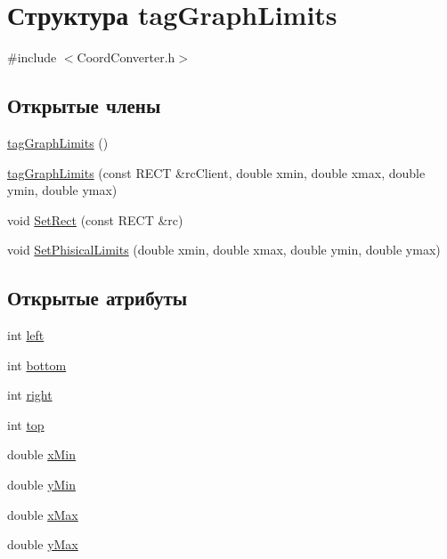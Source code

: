 \hypertarget{structtag_graph_limits}{\section{Структура tag\-Graph\-Limits}
\label{structtag_graph_limits}
}


{\ttfamily \#include $<$Coord\-Converter.\-h$>$}

\subsection*{Открытые члены}
\begin{DoxyCompactItemize}
\item 
\hyperlink{structtag_graph_limits_ae97c154e1d290844d5d1dee15b954373}{tag\-Graph\-Limits} ()
\item 
\hyperlink{structtag_graph_limits_a0b38a407c282fba757714cfdd34e6f58}{tag\-Graph\-Limits} (const R\-E\-C\-T \&rc\-Client, double xmin, double xmax, double ymin, double ymax)
\item 
void \hyperlink{structtag_graph_limits_a1c7dc2a0ff3494b77468982dd9720a57}{Set\-Rect} (const R\-E\-C\-T \&rc)
\item 
void \hyperlink{structtag_graph_limits_a85d12ef619e2a5e2fbdb135cc5f655f0}{Set\-Phisical\-Limits} (double xmin, double xmax, double ymin, double ymax)
\end{DoxyCompactItemize}
\subsection*{Открытые атрибуты}
\begin{DoxyCompactItemize}
\item 
int \hyperlink{structtag_graph_limits_a412cdcb28cd23a1ec7d9e82947d1ffb2}{left}
\item 
int \hyperlink{structtag_graph_limits_a097f924c4f3ca60ce02f39dd4883283a}{bottom}
\item 
int \hyperlink{structtag_graph_limits_a3f92367e0c4ce69812032fa4d1af337d}{right}
\item 
int \hyperlink{structtag_graph_limits_a058d1d93e0e9949f79da494cb0f20c46}{top}
\item 
double \hyperlink{structtag_graph_limits_a066cde124b9855d3ebde544f671885ed}{x\-Min}
\item 
double \hyperlink{structtag_graph_limits_a7e29c3537c44a32d136d9876d53aa494}{y\-Min}
\item 
double \hyperlink{structtag_graph_limits_ab9285cb4e4471d050bd8e644721f7dc0}{x\-Max}
\item 
double \hyperlink{structtag_graph_limits_a55e1c7ce08e09341369609becb48ecae}{y\-Max}
\end{DoxyCompactItemize}



